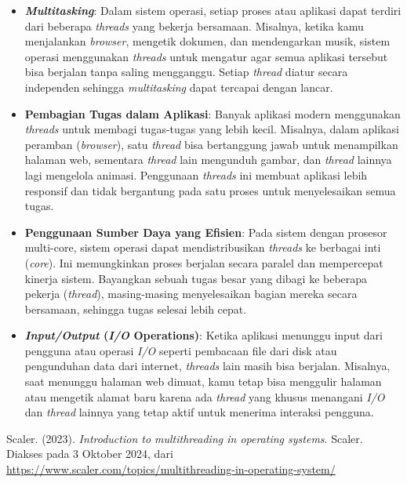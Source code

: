 \documentclass[12pt]{article}
\begin{document}
\begin{itemize}
    \item \textbf{\textit{Multitasking}}: Dalam sistem operasi, setiap proses atau aplikasi dapat terdiri dari beberapa \textit{threads} yang bekerja bersamaan. Misalnya, ketika kamu menjalankan \textit{browser}, mengetik dokumen, dan mendengarkan musik, sistem operasi menggunakan \textit{threads} untuk mengatur agar semua aplikasi tersebut bisa berjalan tanpa saling mengganggu. Setiap \textit{thread} diatur secara independen sehingga \textit{multitasking} dapat tercapai dengan lancar.
    
    \item \textbf{Pembagian Tugas dalam Aplikasi}: Banyak aplikasi modern menggunakan \textit{threads} untuk membagi tugas-tugas yang lebih kecil. Misalnya, dalam aplikasi peramban (\textit{browser}), satu \textit{thread} bisa bertanggung jawab untuk menampilkan halaman web, sementara \textit{thread} lain mengunduh gambar, dan \textit{thread} lainnya lagi mengelola animasi. Penggunaan \textit{threads} ini membuat aplikasi lebih responsif dan tidak bergantung pada satu proses untuk menyelesaikan semua tugas.
    
    \item \textbf{Penggunaan Sumber Daya yang Efisien}: Pada sistem dengan prosesor multi-core, sistem operasi dapat mendistribusikan \textit{threads} ke berbagai inti (\textit{core}). Ini memungkinkan proses berjalan secara paralel dan mempercepat kinerja sistem. Bayangkan sebuah tugas besar yang dibagi ke beberapa pekerja (\textit{thread}), masing-masing menyelesaikan bagian mereka secara bersamaan, sehingga tugas selesai lebih cepat.
    
    \item \textbf{\textit{Input/Output} (\textit{I/O} Operations)}: Ketika aplikasi menunggu input dari pengguna atau operasi \textit{I/O} seperti pembacaan file dari disk atau pengunduhan data dari internet, \textit{threads} lain masih bisa berjalan. Misalnya, saat menunggu halaman web dimuat, kamu tetap bisa menggulir halaman atau mengetik alamat baru karena ada \textit{thread} yang khusus menangani \textit{I/O} dan \textit{thread} lainnya yang tetap aktif untuk menerima interaksi pengguna.
\end{itemize}

\noindent Scaler. (2023). 
\textit{Introduction to multithreading in operating systems}. Scaler. Diakses pada 3 Oktober 2024, dari \\ 
\url{https://www.scaler.com/topics/multithreading-in-operating-system/}
\end{document}
